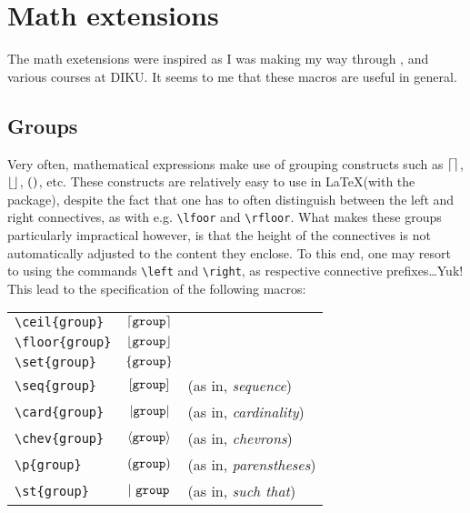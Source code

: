 \section{Math extensions}

\def\commandstyle{{\ttfamily\textbackslash}}
\def\command#1{\texttt{\textbackslash #1}}

The math exetensions were inspired as I was making my way through
\cite{concrete-mathematics}, and various courses at DIKU. It seems to me that
these macros are useful in general.

\subsection{Groups}

Very often, mathematical expressions make use of grouping constructs such as
$\left\lceil{}\right\rceil$, $\left\lfloor{}\right\rfloor$, $\left({}\right)$, etc. These constructs are relatively easy to use
in \LaTeX (with the  package), despite the fact that one has to
often distinguish between the left and right connectives, as with e.g.
\command{lfoor} and \command{rfloor}. What makes these groups particularly
impractical however, is that the height of the connectives is not automatically
adjusted to the content they enclose. To this end, one may resort to using the
commands \command{left} and \command{right}, as respective connective
prefixes\dots Yuk!  This lead to the specification of the following macros:

\vspace{0.1in}

\noindent
\begin{tabular}{lcl}

\command{ceil\{group\}} & $\left\lceil{\mathtt{group}}\right\rceil$ \\

\command{floor\{group\}} & $\left\lfloor{\mathtt{group}}\right\rfloor$ \\

\command{set\{group\}} & $\left\{{\mathtt{group}}\right\}$ \\

\command{seq\{group\}} & $\left[{\mathtt{group}}\right]$ & (as in, \emph{sequence}) \\

\command{card\{group\}} & $\left|{\mathtt{group}}\right|$ & (as in, \emph{cardinality})
\\

\command{chev\{group\}} & $\left\langle{\mathtt{group}}\right\rangle$ & (as in, \emph{chevrons}) \\

\command{p\{group\}} & $\left({\mathtt{group}}\right)$ & (as in, \emph{parenstheses}) \\

\command{st\{group\}} & $\left|\ {\mathtt{group}}\right.$ & (as in, \emph{such that})

\end{tabular}

